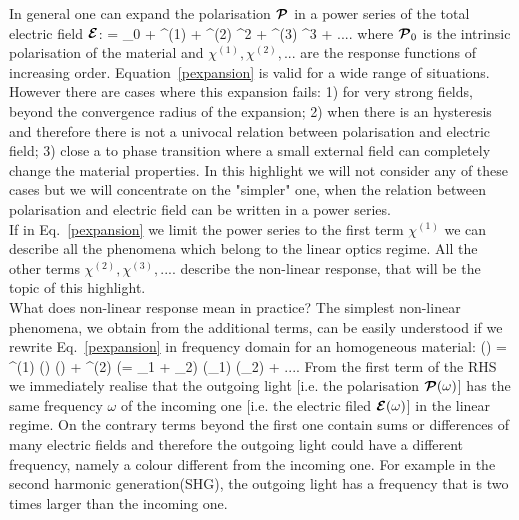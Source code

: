In general one can expand the polarisation  ${\boldsymbol {\cal P}}$ in a power series of the total electric field ${\boldsymbol {\cal E}}$: 
\be
\PPc = \PPc_0 + \chi^{(1)} \EEc + \chi^{(2)} \EEc^2 + \chi^{(3)} \EEc^3 + ....
\label{pexpansion}
\ee
where ${\boldsymbol {\cal P}}_0$ is the intrinsic polarisation of the material and  $\chi^{(1)}, \chi^{(2)},...$ are the response functions of increasing order. Equation~\ref{pexpansion} is valid for a wide range of situations. However there are cases where this expansion fails: 1) for very strong fields, beyond the convergence radius of the expansion\cite{lee2014first}; 2) when there is an hysteresis and therefore there is not a univocal relation between polarisation and electric field; 3) close a to phase transition where a small external field can completely change the material properties. In this highlight we will not consider any of these cases but we will concentrate on the "simpler" one, when the relation between polarisation and electric field can be written in a power series.\\ 
If in Eq.~\ref{pexpansion} we limit the power series to the first term $\chi^{(1)}$ we can describe all the phenomena which belong to the linear optics regime. All the other terms  $\chi^{(2)}, \chi^{(3)},.... $  describe the non-linear response, that will be the topic of this highlight. \\
What does non-linear response mean in practice?  The simplest non-linear phenomena, we obtain from the additional terms,  can be easily understood if we rewrite Eq.~\ref{pexpansion} in frequency domain for an homogeneous material:
\be
\PPc(\omega) = \chi^{(1)} (\omega) \EEc(\omega)  + \chi^{(2)} (\omega = \omega_1 + \omega_2) \EEc(\omega_1) \EEc(\omega_2) + ....
\label{pexpomega}
\ee
From the first term of the RHS we immediately realise that the outgoing light [i.e. the polarisation ${\boldsymbol {\cal P}} (\omega)$] has the same frequency $\omega$ of the incoming one [i.e. the electric filed ${\boldsymbol {\cal E}} (\omega)$] in the linear regime. On the contrary terms beyond the first one contain sums or differences of many electric fields and therefore the outgoing light could have a different frequency, namely a colour different from the incoming one.  For example in the second harmonic generation(SHG), the outgoing light has a frequency that is two times larger than the incoming one. \\
